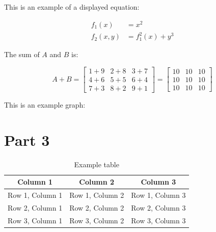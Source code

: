 \documentclass[12pt,a4paper]{report}
\begin{document}
This is an example of a displayed equation:

\begin{align}
    f_1(x)   & = x^2            \\
    f_2(x,y) & = f_1^2(x) + y^3
\end{align}

The sum of $A$ and $B$ is:

\[
    A + B = \begin{bmatrix}
        1+9 & 2+8 & 3+7 \\
        4+6 & 5+5 & 6+4 \\
        7+3 & 8+2 & 9+1
    \end{bmatrix}
    = \begin{bmatrix}
        10 & 10 & 10 \\
        10 & 10 & 10 \\
        10 & 10 & 10
    \end{bmatrix}
\]

This is an example graph:
\begin{center}
\end{center}

\section{Part 3}
\begin{table}[h]
    \centering
    \begin{tabular}{|c|c|c|}
        \hline
        \textbf{Column 1} & \textbf{Column 2} & \textbf{Column 3} \\
        \hline
        Row 1, Column 1   & Row 1, Column 2   & Row 1, Column 3   \\
        \hline
        Row 2, Column 1   & Row 2, Column 2   & Row 2, Column 3   \\
        \hline
        Row 3, Column 1   & Row 3, Column 2   & Row 3, Column 3   \\
        \hline
    \end{tabular}
    \caption{Example table}
\end{table}
\end{document}
